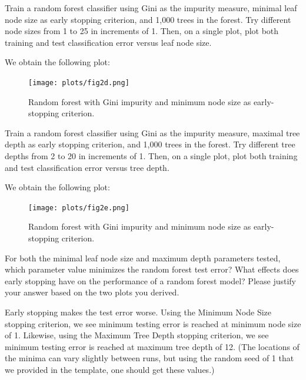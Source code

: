 \indent\problem[2] %
Train a random forest classifier using Gini as the impurity measure, minimal leaf node size as early stopping criterion, and 1,000 trees in the forest. Try different node sizes from 1 to 25 in increments of 1. Then, on a single plot, plot both training and test classification error versus
leaf node size.

\begin{solution}
    We obtain the following plot:
    \begin{figure}[H]
    \begin{center}
    \texttt{[image: plots/fig2d.png]}
    \caption{Random forest with Gini impurity and minimum node size as early-stopping criterion.}
    \end{center}
    \end{figure}
\end{solution}

\problem[2]
Train a random forest classifier using Gini as the impurity measure, maximal tree depth as early stopping criterion, and 1,000 trees in the forest. Try different tree depths from 2 to 20 in increments of 1. Then, on a single plot, plot both training and test classification error versus tree depth.

\begin{solution}
    We obtain the following plot:
    \begin{figure}[H]
    \begin{center}
    \texttt{[image: plots/fig2e.png]}
    \caption{Random forest with Gini impurity and minimum node size as early-stopping criterion.}
    \end{center}
    \end{figure}
\end{solution}

\problem[4]
For both the minimal leaf node size and maximum depth parameters tested, which parameter value minimizes the random forest test error? What effects does early stopping have on the performance of a random forest model?
Please justify your answer based on the two plots you derived.

\begin{solution}
 Early stopping makes the test error worse. Using the Minimum Node Size stopping criterion, we see minimum testing error is reached at minimum node size of 1. Likewise, using the Maximum Tree Depth stopping criterion, we see minimum testing error is reached at maximum tree depth of 12.  (The locations of the minima can vary slightly between runs, but using the random seed of 1 that we provided in the template, one should get these values.)
\end{solution}

